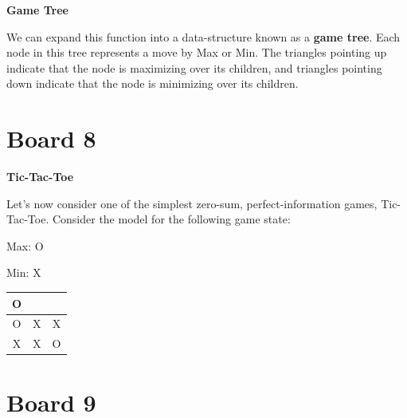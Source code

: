 \documentclass[11pt]{article}
\begin{document}
\textbf{Game Tree}

We can expand this function into a data-structure known as a \textbf{game tree}. Each node in this tree represents a move by Max or Min. The triangles pointing up indicate that the node is maximizing over its children, and triangles pointing down indicate that the node is minimizing over its children.

\begin{center}
\end{center}

\section{Board 8}

\textbf{Tic-Tac-Toe}

Let's now consider one of the simplest zero-sum, perfect-information games, Tic-Tac-Toe. Consider the model for the following game state:

Max: O

Min: X

\begin{center}  
\begin{tabular}{c|c|c}
  O  &   &  \\
  \hline
  O  & X & X \\
  \hline
  X  & X & O
\end{tabular}
\end{center}


\section{Board 9}
\end{document}
